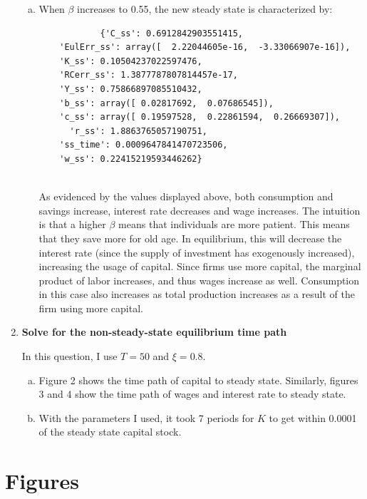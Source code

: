 \documentclass[letterpaper,12pt]{article}
\theoremstyle{definition}
\begin{document}
\begin{enumerate}
\begin{enumerate}[(a)]
	\item When $\beta$ increases to 0.55, the new steady state is characterized by:
	
	\begin{verbatim}
		    {'C_ss': 0.6912842903551415,
 	'EulErr_ss': array([  2.22044605e-16,  -3.33066907e-16]),
 	'K_ss': 0.10504237022597476,
 	'RCerr_ss': 1.3877787807814457e-17,
 	'Y_ss': 0.75866897085510432,
 	'b_ss': array([ 0.02817692,  0.07686545]),
 	'c_ss': array([ 0.19597528,  0.22861594,  0.26669307]),
	  'r_ss': 1.8863765057190751,
 	'ss_time': 0.0009647841470723506,
 	'w_ss': 0.22415219593446262}
 
	\end{verbatim}
	As evidenced by the values displayed above, both consumption and savings increase, interest rate decreases and wage increases. The intuition is that a higher $\beta$ means that individuals are more patient. This means that they save more for old age. In equilibrium, this will decrease the interest rate (since the supply of investment has exogenously increased), increasing the usage of capital. Since firms use more capital, the marginal product of labor increases, and thus wages increase as well. Consumption in this case also increases as total production increases as a result of the firm using more capital.
	\end{enumerate}
	
	\item \textbf{Solve for the non-steady-state equilibrium time path}
	
	In this question, I use $T = 50$ and $\xi = 0.8$.
	\begin{enumerate}[(a)]
		\item Figure 2 shows the time path of capital to steady state. Similarly, figures 3 and 4 show the time path of wages and interest rate to steady state.
		\item With the parameters I used, it took 7 periods for $K$ to get within 0.0001 of the steady state capital stock.
	\end{enumerate}		
	
\end{enumerate}
\clearpage

\section*{Figures}
\end{document}
